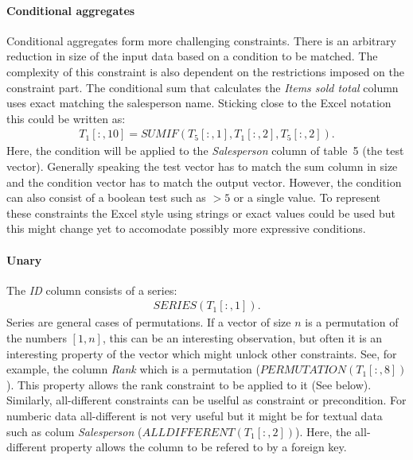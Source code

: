 \documentclass[a4paper]{article}
\newcommand{\range}[3]{#1[#2,#3]}
\newcommand{\rangeall}{:}
\begin{document}
\paragraph{Conditional aggregates}
Conditional aggregates form more challenging constraints.
There is an arbitrary reduction in size of the input data based on a condition to be matched.
The complexity of this constraint is also dependent on the restrictions imposed on the constraint part.
The conditional sum that calculates the \textit{Items sold total} column uses exact matching the salesperson name. Sticking close to the Excel notation this could be written as:
\begin{align}
	\range{T_1}{\rangeall}{10} = \mathit{SUMIF}(\range{T_5}{\rangeall}{1}, \range{T_1}{\rangeall}{2}, \range{T_5}{\rangeall}{2}).
\end{align}
Here, the condition will be applied to the \textit{Salesperson} column of table~5 (the test vector).
Generally speaking the test vector has to match the sum column in size and the condition vector has to match the output vector.
However, the condition can also consist of a boolean test such as $>5$ or a single value.
To represent these constraints the Excel style using strings or exact values could be used but this might change yet to accomodate possibly more expressive conditions.

\paragraph{Unary}
The \textit{ID} column consists of a series:
\begin{align}
	\mathit{SERIES}(\range{T_1}{\rangeall}{1}).
\end{align}
Series are general cases of permutations.
If a vector of size $n$ is a permutation of the numbers $[1, n]$, this can be an interesting observation, but often it is an interesting property of the vector which might unlock other constraints.
See, for example, the column \textit{Rank} which is a permutation ($\mathit{PERMUTATION}(\range{T_1}{\rangeall}{8})$).
This property allows the rank constraint to be applied to it (See below).
Similarly, all-different constraints can be uselful as constraint or precondition.
For numberic data all-different is not very useful but it might be for textual data such as colum \textit{Salesperson} ($\mathit{ALLDIFFERENT}(\range{T_1}{\rangeall}{2})$).
Here, the all-different property allows the column to be refered to by a foreign key.
\end{document}
